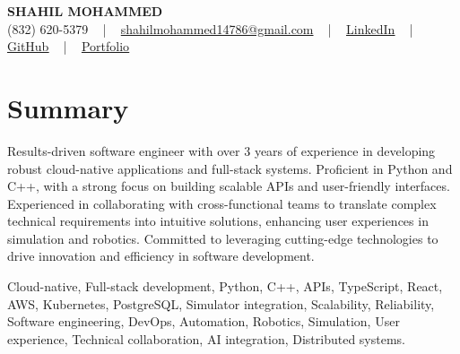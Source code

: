 \documentclass[letterpaper,10pt]{article}
\begin{document}
\begin{center}
    {\fontsize{14pt}{12pt}\selectfont \textbf{\MakeUppercase{Shahil Mohammed}}}\\ \vspace{2pt}
    \fontsize{10pt}{12pt}\selectfont (832) 620-5379 ~ | ~ \href{mailto:shahilmohammed14786@gmail.com}{shahilmohammed14786@gmail.com} ~ | ~  
    \href{https://www.linkedin.com/in/shahil-mohammed-9652931a1/}{\color{blue}\underline{LinkedIn}}  ~ | ~ 
    \href{https://github.com/freakbeast14}{\color{blue}\underline{GitHub}} ~ | ~ 
    \href{https://shahil-mohammed.netlify.app/}{\color{blue}\underline{Portfolio}}
    \vspace{-8pt}
\end{center}

\section{Summary}
\vspace{-2pt}\fontsize{8pt}{9pt}\selectfont
Results-driven software engineer with over 3 years of experience in developing robust cloud-native applications and full-stack systems. Proficient in Python and C++, with a strong focus on building scalable APIs and user-friendly interfaces. Experienced in collaborating with cross-functional teams to translate complex technical requirements into intuitive solutions, enhancing user experiences in simulation and robotics. Committed to leveraging cutting-edge technologies to drive innovation and efficiency in software development.
 \vspace{-5pt}
 
{\fontsize{1pt}{1pt}\selectfont\color{white}
Cloud-native, Full-stack development, Python, C++, APIs, TypeScript, React, AWS, Kubernetes, PostgreSQL, Simulator integration, Scalability, Reliability, Software engineering, DevOps, Automation, Robotics, Simulation, User experience, Technical collaboration, AI integration, Distributed systems.
}
\vspace{-8pt}

\vspace{-2pt}
\end{document}

